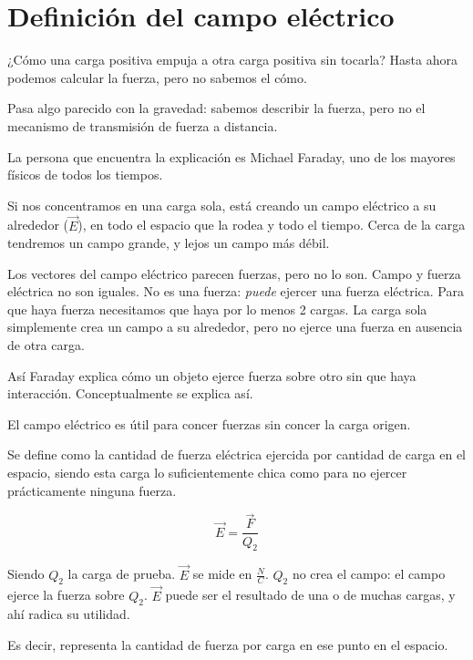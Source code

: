 \section{Definición del campo eléctrico}

¿Cómo una carga positiva empuja a otra carga positiva sin tocarla?
Hasta ahora podemos calcular la fuerza,
pero no sabemos el cómo.

Pasa algo parecido con la gravedad:
sabemos describir la fuerza,
pero no el mecanismo de transmisión de fuerza a distancia.

La persona que encuentra la explicación es 
Michael Faraday, uno de los mayores físicos de todos los tiempos.

Si nos concentramos en una carga sola,
está creando un campo eléctrico a su alrededor (\(\vec{E}\)),
en todo el espacio que la rodea y todo el tiempo.
Cerca de la carga tendremos un campo grande,
y lejos un campo más débil.

Los vectores del campo eléctrico parecen fuerzas,
pero no lo son.
Campo y fuerza eléctrica no son iguales.
No es una fuerza: \textit{puede} ejercer una fuerza eléctrica.
Para que haya fuerza necesitamos que haya por lo menos 2 cargas.
La carga sola simplemente crea un campo a su alrededor,
pero no ejerce una fuerza en ausencia de otra carga.

Así Faraday explica cómo un objeto ejerce fuerza sobre otro sin que haya interacción.
Conceptualmente se explica así.

El campo eléctrico es útil para concer fuerzas sin concer la carga origen.

Se define como la cantidad de fuerza eléctrica ejercida por cantidad de carga en el espacio,
siendo esta carga lo suficientemente chica como para no ejercer prácticamente ninguna fuerza.

\vspace{.3cm}
\begin{equation}
    \vec{E} = \frac{\vec{F}}{Q_2}
\end{equation}

Siendo \(Q_2\) la carga de prueba. \(\vec{E}\) se mide en \(\frac{N}{C}\).
\(Q_2\) no crea el campo: el campo ejerce la fuerza sobre \(Q_2\).
\(\vec{E}\) puede ser el resultado de una o de muchas cargas,
y ahí radica su utilidad.

Es decir, representa la cantidad de fuerza por carga en ese punto en el espacio.